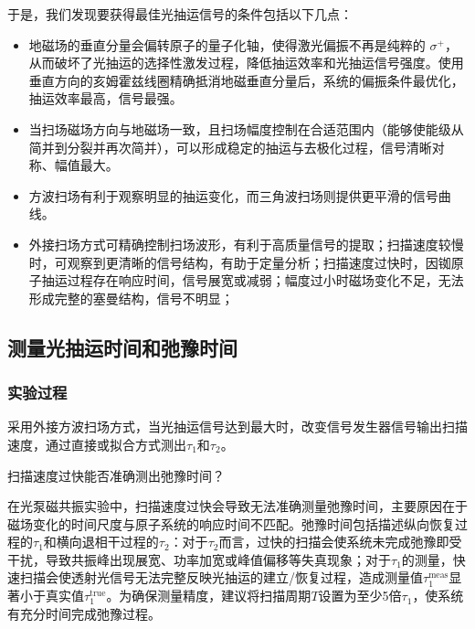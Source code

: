     于是，我们发现要获得最佳光抽运信号的条件包括以下几点：

    \begin{itemize}
        \item 地磁场的垂直分量会偏转原子的量子化轴，使得激光偏振不再是纯粹的 $\sigma^+$，从而破坏了光抽运的选择性激发过程，降低抽运效率和光抽运信号强度。使用垂直方向的亥姆霍兹线圈精确抵消地磁垂直分量后，系统的偏振条件最优化，抽运效率最高，信号最强。

        \item 当扫场磁场方向与地磁场一致，且扫场幅度控制在合适范围内（能够使能级从简并到分裂并再次简并），可以形成稳定的抽运与去极化过程，信号清晰对称、幅值最大。

        \item 方波扫场有利于观察明显的抽运变化，而三角波扫场则提供更平滑的信号曲线。
        
        \item 外接扫场方式可精确控制扫场波形，有利于高质量信号的提取；扫描速度较慢时，可观察到更清晰的信号结构，有助于定量分析；扫描速度过快时，因铷原子抽运过程存在响应时间，信号展宽或减弱；幅度过小时磁场变化不足，无法形成完整的塞曼结构，信号不明显；

    \end{itemize}









\subsection{测量光抽运时间和弛豫时间}


\subsubsection{实验过程}
   采用外接方波扫场方式，当光抽运信号达到最大时，改变信号发生器信号输出扫描速度，通过直接或拟合方式测出$\tau_1$和$\tau_2$。
\begin{ubox}
 {扫描速度过快能否准确测出弛豫时间？}

在光泵磁共振实验中，扫描速度过快会导致无法准确测量弛豫时间，主要原因在于磁场变化的时间尺度与原子系统的响应时间不匹配。弛豫时间包括描述纵向恢复过程的$\tau_1$和横向退相干过程的$\tau_2$：对于$\tau_2$而言，过快的扫描会使系统未完成弛豫即受干扰，导致共振峰出现展宽、功率加宽或峰值偏移等失真现象；对于$\tau_1$的测量，快速扫描会使透射光信号无法完整反映光抽运的建立/恢复过程，造成测量值$\tau_1^{\mathrm{meas}}$显著小于真实值$\tau_1^{\mathrm{true}}$。为确保测量精度，建议将扫描周期$T$设置为至少5倍$\tau_1$，使系统有充分时间完成弛豫过程。
\end{ubox}

